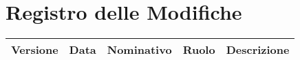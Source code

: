 \section*{\Large Registro delle Modifiche}
    \begin{table}[h]
        \centering
        \renewcommand\tabularxcolumn[1]{m{#1}} %
        \renewcommand{\arraystretch}{1.5}
        \begin{tabularx}{0.98\textwidth}
            {c|c|c|c|>{\centering\arraybackslash}X}
            \rowcolor{black}
            \textbf{\color{white} Versione} & \textbf{\color{white} Data} & \textbf{\color{white} Nominativo} & \textbf{\color{white} Ruolo} & \textbf{\color{white} Descrizione} \\ 
            \hline


\end{tabularx}
\end{table}

